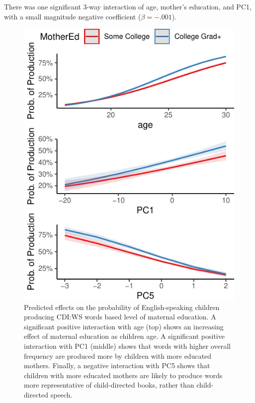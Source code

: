 \documentclass[10pt, letterpaper]{article}
\newenvironment{CodeChunk}{}{}
\begin{document}
There was one significant 3-way interaction of age, mother's education,
and PC1, with a small magnitude negative coefficient (\(\beta=-.001\)).

\begin{CodeChunk}
\begin{figure}[H]

{\centering \includegraphics{figs/unnamed-chunk-10-1} 

}

\caption[Predicted effects on the probability of English-speaking children producing CDI:WS words based level of maternal education]{Predicted effects on the probability of English-speaking children producing CDI:WS words based level of maternal education. A significant positive interaction with age (top) shows an increasing effect of maternal education as children age. A significant positive interaction with PC1 (middle) shows that words with higher overall frequency are produced more by children with more educated mothers. Finally, a negative interaction with PC5 shows that children with more educated mothers are likely to produce words more representative of child-directed books, rather than child-directed speech.}\label{fig:unnamed-chunk-10}
\end{figure}
\end{CodeChunk}
\end{document}
